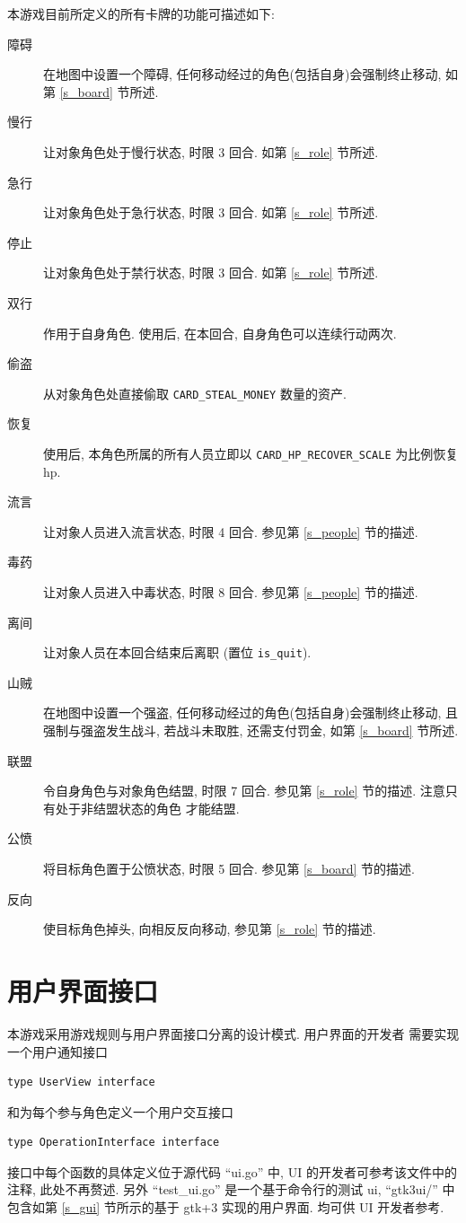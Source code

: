 \documentclass[UTF8, zihao=-4]{ctexart} %
\newcommand{\lcode}{\lstinline} % 段内插入代码
\begin{document}
本游戏目前所定义的所有卡牌的功能可描述如下:
\begin{description}
    \item [障碍] 在地图中设置一个障碍, 任何移动经过的角色(包括自身)会强制终止移动, 如第 \ref{s_board} 节所述.
    \item [慢行] 让对象角色处于慢行状态, 时限 3 回合. 如第 \ref{s_role} 节所述.
    \item [急行] 让对象角色处于急行状态, 时限 3 回合. 如第 \ref{s_role} 节所述.
    \item [停止] 让对象角色处于禁行状态, 时限 3 回合. 如第 \ref{s_role} 节所述.
    \item [双行] 作用于自身角色. 使用后, 在本回合, 自身角色可以连续行动两次.
    \item [偷盗] 从对象角色处直接偷取 \lcode{CARD_STEAL_MONEY} 数量的资产. 
    \item [恢复] 使用后, 本角色所属的所有人员立即以 \lcode{CARD_HP_RECOVER_SCALE} 为比例恢复 hp.
    \item [流言] 让对象人员进入流言状态, 时限 4 回合. 参见第 \ref{s_people} 节的描述.
    \item [毒药] 让对象人员进入中毒状态, 时限 8 回合. 参见第 \ref{s_people} 节的描述.
    \item [离间] 让对象人员在本回合结束后离职 (置位 \lcode{is_quit}). 
    \item [山贼] 在地图中设置一个强盗, 任何移动经过的角色(包括自身)会强制终止移动, 且强制与强盗发生战斗,
        若战斗未取胜, 还需支付罚金, 如第 \ref{s_board} 节所述.
    \item [联盟] 令自身角色与对象角色结盟, 时限 7 回合. 参见第 \ref{s_role} 节的描述. 注意只有处于非结盟状态的角色
        才能结盟.
    \item [公愤] 将目标角色置于公愤状态, 时限 5 回合. 参见第 \ref{s_board} 节的描述.
    \item [反向] 使目标角色掉头, 向相反反向移动, 参见第 \ref{s_role} 节的描述.
\end{description}

\section{用户界面接口}
\label{s_ui}
本游戏采用游戏规则与用户界面接口分离的设计模式. 用户界面的开发者
需要实现一个用户通知接口 
\begin{lstlisting}
type UserView interface
\end{lstlisting}
和为每个参与角色定义一个用户交互接口
\begin{lstlisting}
type OperationInterface interface 
\end{lstlisting}
接口中每个函数的具体定义位于源代码 ``ui.go'' 中, 
UI 的开发者可参考该文件中的注释, 此处不再赘述. 
另外 ``test\_ui.go'' 是一个基于命令行的测试 ui,
``gtk3ui/'' 中包含如第 \ref{s_gui} 节所示的基于 gtk+3 实现的用户界面.
均可供 UI 开发者参考.
\end{document}
